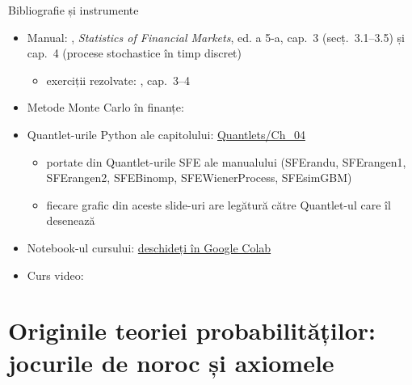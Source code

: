 \begin{frame}{Bibliografie și instrumente}
\itemsize{\small}
\begin{itemize}
    \item Manual: , \textit{Statistics of Financial Markets}, ed. a 5-a, cap.~3 (secț.~3.1--3.5) și cap.~4 (procese stochastice în timp discret)
    \begin{itemize}
        \item exerciții rezolvate: , cap.~3--4
    \end{itemize}
    \item Metode Monte Carlo în finanțe: 
    \item Quantlet-urile Python ale capitolului: \href{https://github.com/danpele/SFM/tree/main/Quantlets/Ch_04}{Quantlets/Ch\_04}
    \begin{itemize}
        \item portate din Quantlet-urile SFE ale manualului (SFErandu, SFErangen1, SFErangen2, SFEBinomp, SFEWienerProcess, SFEsimGBM)
        \item fiecare grafic din aceste slide-uri are legătură către Quantlet-ul care îl desenează
    \end{itemize}
    \item Notebook-ul cursului: \href{\colaburl{notebooks/EN/chapter4_lecture_notebook.ipynb}}{deschideți în Google Colab}
    \item Curs video: 
\end{itemize}
\end{frame}


\section{Originile teoriei probabilităților: jocurile de noroc și axiomele}

